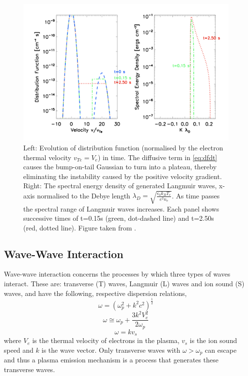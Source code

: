 \begin{figure}[ht]
    \centering
    \includegraphics[width=\columnwidth]{Images/L_wave_growth.png}
    \caption[Langmuir wave distriburtion function and spectral energy density.]{Left: Evolution of distribution function (normalised by the electron thermal velocity $v_{Te}=V_e$) in time. The diffusive term in \ref{eq:dfdt} causes the bump-on-tail Gaussian to turn into a plateau, thereby eliminating the instability caused by the positive velocity gradient. Right: The spectral energy density of generated Langmuir waves, x-axis normalised to the Debye length $\lambda_D=\sqrt{\frac{\epsilon_0 k_B T_e}{e^2 n_e}}$. As time passes the spectral range of Langmuir waves increases. Each panel shows successive times of t=0.15s (green, dot-dashed line) and t=2.50s (red, dotted line). Figure taken from \cite{Reid2014}.} %
    \label{fig:Lwavegrowth}
\end{figure}

\subsection{Wave-Wave Interaction}\label{Plasma Emission}
Wave-wave interaction concerns the processes by which three types of waves interact. These are: transverse (T) waves, Langmuir (L) waves and ion sound (S) waves, and have the following, respective dispersion relations,
$$ \omega=(\omega_p^2 +k^2c^2)^{\frac{1}{2}} $$
$$ \omega \cong \omega_p + \frac{3k^2V_e^2}{2 \omega_p}$$
$$ \omega = kv_s $$
where $V_e$ is the thermal velocity of electrons in the plasma, $v_s$ is the ion sound speed and $k$ is the wave vector. Only transverse waves with $\omega > \omega_p $ can escape and thus a plasma emission mechanism is a process that generates these transverse waves. 

